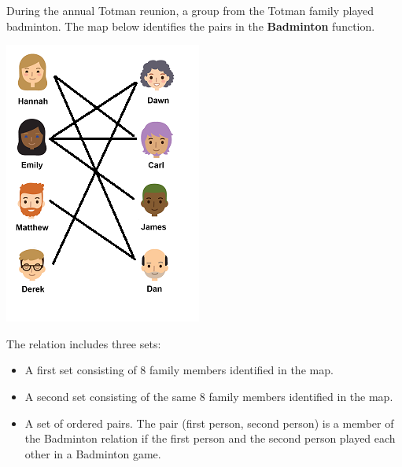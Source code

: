 \documentclass{ximera}
\begin{document}
\begin{definition}
  During the annual Totman reunion, a group from the Totman family played badminton. The map below identifies the pairs in the \textbf{Badminton} function.
  
  

    \includegraphics[width=245px,height=352px]{pics/badminton.png}

  
 

  The  relation includes three sets:
    \begin{itemize}
    \item A first set consisting of 8 family members identified in the map.
    \item A second set consisting of the same 8 family members identified in the map.
    \item A set of ordered pairs. The pair (first person, second person) is a member of the Badminton relation if the first person and the second person played each other in a Badminton game.
    \end{itemize}

  
\end{definition}
\end{document}
